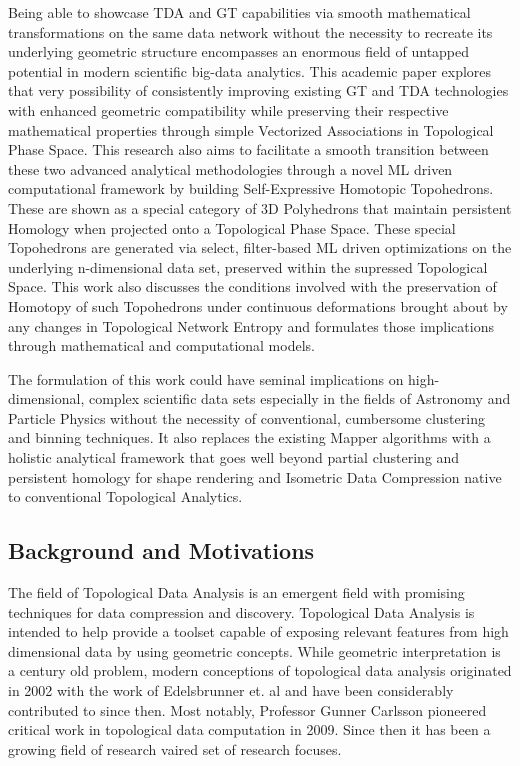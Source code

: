 Being able to showcase TDA and GT capabilities via smooth mathematical transformations on the same data network without the necessity to recreate its underlying geometric structure encompasses an enormous field of untapped potential in modern scientific big-data analytics. This academic paper explores that very possibility of consistently improving existing GT and TDA technologies with enhanced geometric compatibility while preserving their respective mathematical properties through simple Vectorized Associations in Topological Phase Space. This research also aims to facilitate a smooth transition between these two advanced analytical methodologies through a novel ML driven computational framework by building Self-Expressive Homotopic Topohedrons. These are shown as a special category of 3D Polyhedrons that maintain persistent Homology when projected onto a Topological Phase Space. These special Topohedrons are generated via select, filter-based ML driven optimizations on the underlying n-dimensional data set, preserved within the supressed Topological Space. This work also discusses the conditions involved with the preservation of Homotopy of such Topohedrons under continuous deformations brought about by any changes in Topological Network Entropy and formulates those implications through mathematical and computational models.

The formulation of this work could have seminal implications on high-dimensional, complex scientific data sets especially in the fields of Astronomy and Particle Physics without the necessity of conventional, cumbersome clustering and binning techniques. It also replaces the existing Mapper algorithms with a holistic analytical framework that goes well beyond partial clustering and persistent homology for shape rendering and Isometric Data Compression native to conventional Topological Analytics.




\subsection{Background and Motivations}
The field of Topological Data Analysis is an emergent field with promising techniques for data compression and discovery. Topological Data Analysis is intended to help provide a toolset capable of exposing relevant features from high dimensional data by using geometric concepts. While geometric interpretation is a century old problem, modern conceptions of topological data analysis originated in 2002 with the work of Edelsbrunner et. al and have been considerably contributed to since then. Most notably, Professor Gunner Carlsson pioneered critical work in topological data computation in 2009. Since then it has been a growing field of research vaired set of research focuses.

